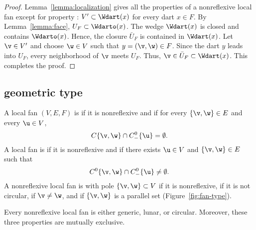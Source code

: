 \begin{proof}
  Lemma~\ref{lemma:localization} gives all the properties of a
  nonreflexive local fan except for property : $V'\subset
  \Wdart(x)$ for every dart $x\in F$.  By Lemma~\ref{lemma:face}, $U_F
  \subset \Wdarto(x)$.  The wedge $\Wdart(x)$ is closed and contains
  $\Wdarto(x)$. Hence, the closure $\bar U_F$ is contained in
  $\Wdart(x)$.  Let $\v\in V'$ and choose $\w\in V$ such that
  $y=(\v,\w)\in F$.
  Since the dart $y$ leads into $U_F$, every neighborhood of $\v$
  meets $U_F$.  Thus, $\v\in \bar U_F\subset \Wdart(x)$.  This
  completes the proof.
\end{proof}


\subsection{geometric type}\label{sec:types}

\begin{definition}
A local fan $(V,E,F)$ is   
if it is nonreflexive and if for every $\{\v,\w\}\in E$
and every $\u\in V$, 
\[ 
C\{\v,\w\}\cap C^0_-\{\u\} = \emptyset.
\] 
A  local fan is  if it is nonreflexive and if there
exists $\u\in V$ and $\{\v,\w\}\in E$ such that
\[ 
C^0\{\v,\w\}\cap C^0_-\{\u\}\ne \emptyset.
\] 
A nonreflexive local fan is  with pole
$\{\v,\w\} \subset V$ if it is nonreflexive, if it is not circular, if $\v\ne\w$, and if
$\{\v,\w\}$ is a parallel set (Figure~\ref{fig:fan-type}).
\end{definition}
%
%
%

\figQTCGYTB %


\begin{lemma}[trichotomy]%
Every nonreflexive local fan is either
generic, lunar, or circular.  Moreover, these three properties are
mutually exclusive.
\end{lemma}
%
%
%
%
%

